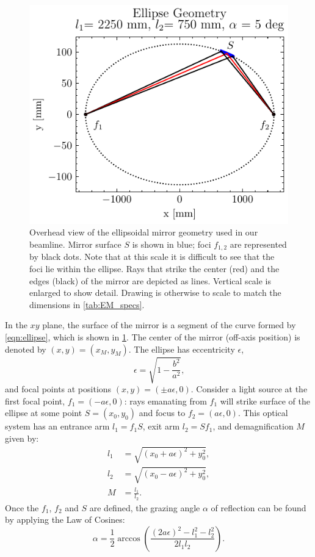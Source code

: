 \begin{figure}
	\centering
	\includegraphics[width=1.0\textwidth]{figures/chap2/EM_2D.pdf}
	\caption{Overhead view of the ellipsoidal mirror geometry used in our beamline. Mirror surface $S$ is shown in blue; foci $f_{1,2}$ are represented by black dots. Note that at this scale it is difficult to see that the foci lie within the ellipse. Rays that strike the center (red) and the edges (black) of the mirror are depicted as lines. Vertical scale is enlarged to show detail. Drawing is otherwise to scale to match the dimensions in \cref{tab:EM_specs}.}
	\label{fig:EM_2D}
\end{figure}

In the $xy$ plane, the surface of the mirror is a segment of the curve formed by \cref{eqn:ellipse}, which is shown in \cref{fig:EM_2D}. The center of the mirror (off-axis position) is denoted by $(x,y)=(x_M, y_M)$. The ellipse has eccentricity $\epsilon$,
\begin{equation}
\epsilon = \sqrt{1-\frac{b^2}{a^2} } \text{,}
\end{equation}
and focal points at positions $(x,y) = (\pm a \epsilon,0)$. Consider a light source at the first focal point,  $f_1 = (-a \epsilon,0)$: rays emanating from $f_1$ will strike surface of the ellipse at some point $S = (x_0, y_0)$ and focus to $f_2 = (a \epsilon,0)$. This optical system has an entrance arm $l_1 = f_1S$, exit arm $l_2=Sf_1$, and demagnification $M$ given by:
\begin{align}
l_1 &= \sqrt{ (x_0+a \epsilon)^2 + y_0^2 }, \\
l_2 &= \sqrt{ (x_0-a \epsilon)^2 + y_0^2 }, \\
M &= \frac{l_1}{l_2}.
\end{align}
Once the $f_1$, $f_2$ and $S$ are defined, the grazing angle $\alpha$ of reflection can be found by applying the Law of Cosines:
\begin{equation}
\alpha = \frac{1}{2} \arccos \left( \frac{(2 a \epsilon)^2 - l_1^2 - l_2^2}{2 l_1 l_2} \right).
\end{equation}

